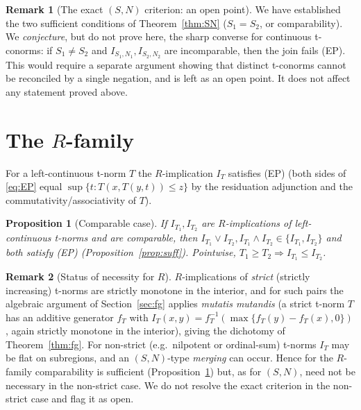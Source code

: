 \documentclass{amsart}
\theoremstyle{plain}
\newtheorem{proposition}{Proposition}
\theoremstyle{definition}
\newtheorem{remark}{Remark}
\begin{document}
\begin{remark}[The exact $(S,N)$ criterion: an open point]\label{rem:SNexact}
We have established the two sufficient conditions of Theorem~\ref{thm:SN} ($S_1=S_2$, or
comparability).  We \emph{conjecture}, but do not prove here, the sharp converse for
continuous t-conorms: if $S_1\ne S_2$ and $I_{S_1,N_1},I_{S_2,N_2}$ are incomparable, then
the join fails (EP).  This would require a separate argument showing that distinct
t-conorms cannot be reconciled by a single negation, and is left as an open point.  It does
not affect any statement proved above.
\end{remark}

\section{The $R$-family}\label{sec:R}

For a left-continuous t-norm $T$ the $R$-implication $I_T$ satisfies (EP) (both sides of
\eqref{eq:EP} equal $\sup\{t:T(x,T(y,t))\le z\}$ by the residuation adjunction and the
commutativity/associativity of $T$).

\begin{proposition}[Comparable case]\label{prop:R}
If $I_{T_1},I_{T_2}$ are $R$-implications of left-continuous t-norms and are comparable,
then $I_{T_1}\vee I_{T_2},I_{T_1}\wedge I_{T_2}\in\{I_{T_1},I_{T_2}\}$ and both satisfy
\textup{(EP)} (Proposition~\ref{prop:suff}).  Pointwise, $T_1\ge T_2\Rightarrow
I_{T_1}\le I_{T_2}$.
\end{proposition}

\begin{remark}[Status of necessity for $R$]\label{rem:R}
$R$-implications of \emph{strict} (strictly increasing) t-norms are strictly monotone in
the interior, and for such pairs the algebraic argument of Section~\ref{sec:fg} applies
\emph{mutatis mutandis} (a strict t-norm $T$ has an additive generator $f_T$ with
$I_T(x,y)=f_T^{-1}(\max\{f_T(y)-f_T(x),0\})$, again strictly monotone in the interior),
giving the dichotomy of Theorem~\ref{thm:fg}.  For non-strict (e.g.\ nilpotent or
ordinal-sum) t-norms $I_T$ may be flat on subregions, and an
$(S,N)$-type \emph{merging} can occur.  Hence for the $R$-family comparability is
sufficient (Proposition~\ref{prop:R}) but, as for $(S,N)$, need not be necessary in the
non-strict case.  We do not resolve the exact criterion in the non-strict case and flag it
as open.
\end{remark}
\end{document}

